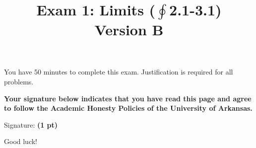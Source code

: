 \documentclass[12pt]{article}
\title{\vspace{-8pc}
\vfill{\Huge
	\bf Exam 1: Limits ($\textstyle\oint$2.1-3.1)} \\
	Version B}
\author{}
\date{}
\begin{document}
\maketitle
\vspace{-3pc}
 You have 50 minutes to complete this exam.  Justification is required for all problems. 

\vspace{2pc}
\noindent\textbf{Your signature below indicates that you have read this page and agree to follow the Academic Honesty Policies of the University of Arkansas.}  

\vfill
\noindent Signature: {\bf (1 pt)} \underline{\hspace{73ex}}
\begin{flushright}\Large Good luck!\end{flushright}
\end{document}

